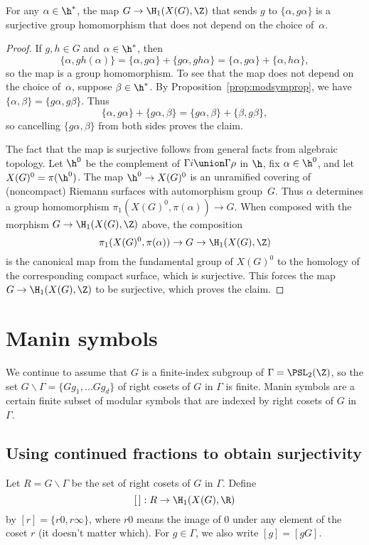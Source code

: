 \documentclass{report}
\begin{document}
\begin{proposition}\label{prop:group_to_homology}
For any $\alpha\in\h^*$, the map $G\to\H_1(X(G),\Z)$ that sends
$g$ to $\{\alpha,g\alpha\}$ is a surjective group homomorphism
that does not depend on the choice of~$\alpha$.
\end{proposition}
\begin{proof}
If $g, h\in G$ and $\alpha\in\h^*$, then
\[
  \{\alpha, gh(\alpha)\} = \{\alpha, g\alpha\} + \{g\alpha,
  gh\alpha \}  = \{\alpha, g\alpha \} + \{\alpha, h \alpha\},
\]
so the map is a group homomorphism.   To see that the map does not
depend on the choice of~$\alpha$, suppose $\beta\in\h^*$.  By
Proposition~\ref{prop:modsymprop}, we have $\{\alpha,\beta\} =
\{g\alpha,g\beta\}$.  Thus
$$\{\alpha,g\alpha\} + \{g\alpha,\beta\} = \{g\alpha,\beta\} +
\{\beta,g\beta\},$$ so cancelling $\{g\alpha,\beta\}$ from both
sides proves the claim.

The fact that the map is surjective follows from general facts
from algebraic topology.    Let $\h^0$ be the complement of
$\Gamma i \union \Gamma\rho$ in $\h$, fix $\alpha\in\h^0$, and let
$X(G)^0=\pi(\h^0)$.  The map $\h^0\to X(G)^0$ is an unramified
covering of (noncompact) Riemann surfaces with automorphism
group~$G$.  Thus $\alpha$ determines a group homomorphism
$\pi_1(X(G)^0,\pi(\alpha))\to G$.  When composed with the morphism
$G\to \H_1(X(G),\Z)$ above, the composition
$$\pi_1(X(G)^0,\pi(\alpha))\to G\to\H_1(X(G),\Z)$$
is the canonical map from the fundamental group of $X(G)^0$ to the
homology of the corresponding compact surface, which is
surjective.  This forces the map $G\to \H_1(X(G),\Z)$ to be
surjective, which proves the claim.
\end{proof}


\section{Manin symbols}\label{sec:maninsymintro}
We continue to assume that $G$ is a finite-index subgroup of
$\Gamma=\PSL_2(\Z)$, so the set $G\backslash\Gamma = \{G g_1,
\dots G g_d\}$ of right cosets of $G$ in $\Gamma$ is finite.
Manin symbols are a certain finite subset of modular symbols that
are indexed by right cosets of $G$ in $\Gamma$.

\subsection{Using continued fractions to obtain surjectivity}
Let $R=G\backslash\Gamma$ be the set of right cosets of $G$ in
$\Gamma$.  Define
\[
   [\,] : R\to \H_1(X(G),\R)
\]
by $[r] = \{r0,r\infty\}$, where $r0$ means the image of $0$ under
any element of the coset $r$ (it doesn't matter which).  For
$g\in\Gamma$, we also write $[g]=[gG]$.
\end{document}
